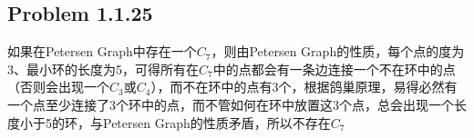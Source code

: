 \subsection*{Problem 1.1.25}
如果在Petersen Graph中存在一个$C_7$，则由Petersen Graph的性质，每个点的度为3、最小环的长度为5，可得所有在$C_7$中的点都会有一条边连接一个不在环中的点（否则会出现一个$C_3$或$C_4$），而不在环中的点有3个，根据鸽巢原理，易得必然有一个点至少连接了3个环中的点，而不管如何在环中放置这3个点，总会出现一个长度小于5的环，与Petersen Graph的性质矛盾，所以不存在$C_7$

